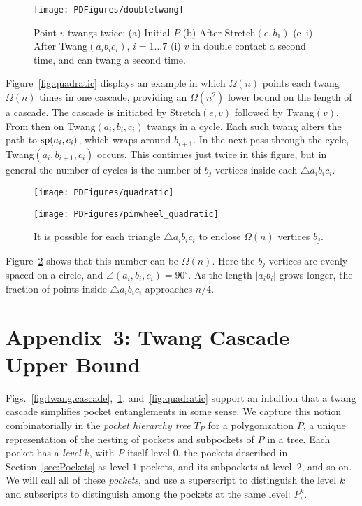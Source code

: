 \pdfoutput=1  \documentclass{article}
\def\sp{\mathop{\rm sp}\nolimits}
\def\st{{\sc Stretch}}
\def\tw{{\sc Twang}}
\newcommand{\figlab}[1]{\label{fig:#1}}
\newcommand{\secref}[1]{\ref{sec:#1}}
\newcommand{\figref}[1]{\ref{fig:#1}}
\begin{document}
\begin{figure}[htbp]
\centering
\texttt{[image: PDFigures/doubletwang]}
\vspace{-1.7em}\caption{Point $v$ twangs twice: (a) Initial $P$ (b)
After  \st$(e, b_1)$ (c--i) After \tw$(a_ib_ic_i)$, $i = 1 \ldots 7$
(i) $v$ in double contact a second time, and can
twang a second time. } \figlab{double.twang}
\end{figure}


Figure~\figref{quadratic} displays an example in which 
$\Omega(n)$ points each
twang $\Omega(n)$ times in one cascade, providing an
$\Omega(n^2)$ lower bound on the length of a cascade.
The cascade is initiated by \st$(e,v)$ followed by \tw$(v)$.
From then on \tw$(a_i,b_i,c_i)$ twangs in a cycle.
Each such twang alters the path to $\sp(a_i,c_i)$,
which wraps around $b_{i+1}$.  In the next pass through the cycle,
\tw$(a_i,b_{i+1},c_i)$ occurs.
This continues just twice in this figure,
but in general the number of cycles is the number of
$b_j$ vertices inside each $\triangle a_i b_i c_i$.
\begin{figure}[htbp]
\begin{minipage}[b]{0.47\linewidth}
\centering
\texttt{[image: PDFigures/quadratic]}
\caption{\st$(e,v)$ followed by \tw$(v)$ initiates a 
quadratic-length twang cascade.}
\figlab{quadratic}
\end{minipage}\hspace{0.06\linewidth}\begin{minipage}[b]{0.47\linewidth}
\centering
\texttt{[image: PDFigures/pinwheel\_quadratic]}
\caption{It is possible for each triangle $\triangle a_i b_i c_i$
to enclose $\Omega(n)$ vertices $b_j$.
}
\figlab{pinwheel_quadratic}
\end{minipage}
\end{figure}
Figure~\figref{pinwheel_quadratic} shows that this number can be $\Omega(n)$.
Here the $b_j$ vertices are evenly spaced on a circle,
and $\angle (a_i,b_i,c_i) = 90^\circ$.
As the length $|a_i b_i|$ grows longer, the fraction of points
inside $\triangle a_i b_i c_i$ approaches $n/4$.


\section*{Appendix~3: Twang Cascade Upper Bound}
Figs.~\figref{twang.cascade},~\figref{double.twang}, and~\figref{quadratic}
support an
intuition that a twang cascade simplifies pocket entanglements in
some sense.
We capture this notion combinatorially in the \emph{pocket hierarchy tree} 
$T_P$ for a polygonization $P$,
a unique representation of the nesting of
pockets and subpockets of $P$ in a tree.
Each pocket has a \emph{level} $k$, with $P$ itself level 0,
the pockets
described in Section~\secref{Pockets} as level-$1$ pockets,
and its subpockets at level~$2$, and so on.
We will call all of these \emph{pockets}, and use
a superscript to distinguish the level $k$ and subscripts
to distinguish among the pockets at the same level:
$P^k_i$.
\end{document}
